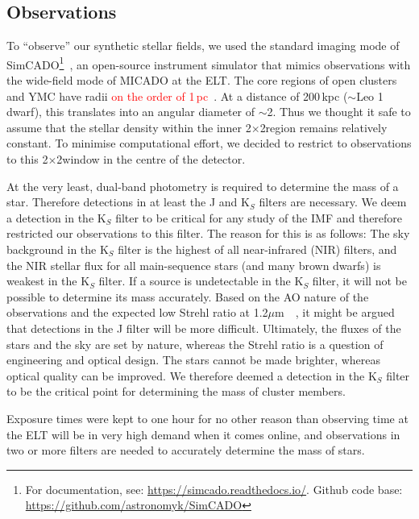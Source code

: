 \documentclass{aa}
\newcommand{\um}{$\mu$m~}
\newcommand{\s}{$\sim$}
\newcommand{\langedit}[1]{\textcolor{red}{#1}}
\begin{document}
\subsection{Observations}
\label{sec:telescope}

To ``observe'' our synthetic stellar fields, we used the standard imaging mode of SimCADO\footnote{For documentation, see: \url{https://simcado.readthedocs.io/}.
Github code base: \url{https://github.com/astronomyk/SimCADO}}~\citep{leschinski2016}, an open-source instrument simulator that mimics observations with the wide-field mode of MICADO at the ELT\@.
The core regions of open clusters and YMC have radii \langedit{on the order of 1\,pc}~\citep{portegies2010}.
At a distance of 200\,kpc ($\sim$Leo 1 dwarf), this translates into an angular diameter of \s2\arcsec.
Thus we thought it safe to assume that the stellar density within the inner 2\arcsec$\times$2\arcsec region remains relatively constant.
To minimise computational effort, we decided to restrict to observations to this 2\arcsec$\times$2\arcsec window in the centre of the detector.

At the very least, dual-band photometry is required to determine the mass of a star.
Therefore detections in at least the J and K$_S$ filters are necessary.
We deem a detection in the K$_S$ filter to be critical for any study of the IMF and therefore restricted our observations to this filter.
The reason for this is as follows: The sky background in the K$_S$ filter is the highest of all near-infrared (NIR) filters, and the NIR stellar flux for all main-sequence stars (and many brown dwarfs) is weakest in the K$_S$ filter.
If a source is undetectable in the K$_S$ filter, it will not be possible to determine its mass accurately.
Based on the AO nature of the observations and the expected low Strehl ratio at 1.2\um~\citep{clenet2016}, it might be argued that detections in the J filter will be more difficult.
Ultimately, the fluxes of the stars and the sky are set by nature, whereas the Strehl ratio is a question of engineering and optical design.
The stars cannot be made brighter, whereas optical quality can be improved.
We therefore deemed a detection in the K$_S$ filter to be the critical point for determining the mass of cluster members.

Exposure times were kept to one hour for no other reason than observing time at the ELT will be in very high demand when it comes online, and observations in two or more filters are needed to accurately determine the mass of stars.
\end{document}
